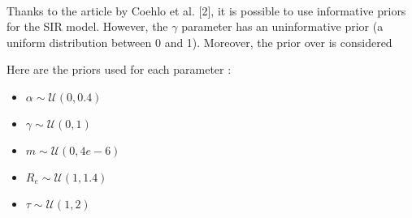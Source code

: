 \documentclass[11pt, a4paper]{article}
\begin{document}
\paragraph{}
Thanks to the article by Coehlo et al. [2], it is possible to use informative priors for the SIR model. However, the $\gamma$ parameter has an uninformative prior (a uniform distribution between 0 and 1). Moreover, the prior over \tau is considered 

Here are the priors used for each parameter : 
\begin{itemize}
\item $\alpha \sim \mathcal{U}(0, 0.4)$ 
\item $\gamma \sim \mathcal{U}(0, 1)$
\item $m \sim  \mathcal{U}(0, 4e-6)$
\item $R_e \sim \mathcal{U}(1, 1.4)$
\item $ \tau \sim \mathcal{U}(1, 2)$
\end{itemize}
\end{document}
